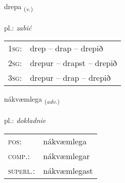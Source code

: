 \documentclass[frontgrid, backgrid]{flacards}\usepackage[]{graphicx}\usepackage[]{xcolor}
\begin{document}
\renewcommand{\flhead}{\vskip5pt \fboxsep=0pt {\small\bfseries\footnotesize Sagnorð | Verb}}
\renewcommand{\fcfoot}{\vskip5pt \fboxsep=0pt \hspace{2pt}{\small\bfseries\footnotesize 2K}}

\renewcommand{\blhead}{\vskip5pt {\small\bfseries\footnotesize Sagnorð | Verb }}
\renewcommand{\bcfoot}{\vskip5pt \hspace{2pt}{\small\bfseries\footnotesize 2K}}


{drepa \small{\textsubscript{(\textit{v.})}} \\[1ex] %
\textphonetic{[trɛːpa]} \\
pl.: \emph{zabić} \\  [2ex]
\renewcommand*{\arraystretch}{0.8}
\begin{tabular}{p{1cm}l}
\textsc{1sg}: & drep -- drap -- drepið \\ 
\textsc{2sg}: & drepur -- drapst -- drepið \\ 
\textsc{3sg}: & drepur -- drap -- drepið \\ 
\end{tabular}
}

\renewcommand{\flhead}{\vskip5pt \fboxsep=0pt {\small\bfseries\footnotesize Atviksorð | Adverb}}
\renewcommand{\fcfoot}{\vskip5pt \fboxsep=0pt \hspace{2pt}{\small\bfseries\footnotesize 2K}}

\renewcommand{\blhead}{\vskip5pt {\small\bfseries\footnotesize Atviksorð | Adverb }}
\renewcommand{\bcfoot}{\vskip5pt \hspace{2pt}{\small\bfseries\footnotesize 2K}}


{nákvæmlega \small{\textsubscript{(\textit{adv.})}} \\[1ex] %
\textphonetic{[nauːkʰvaimlɛɣa]} \\
pl.: \emph{dokładnie} \\  [2ex]
\renewcommand*{\arraystretch}{0.8}
\begin{tabular}{ll}
\textsc{pos}: & nákvæmlega \\ 
\textsc{comp.}: & nákvæmlegar \\ 
\textsc{superl.}: & nákvæmlegast \\
\end{tabular}
}
\end{document}
